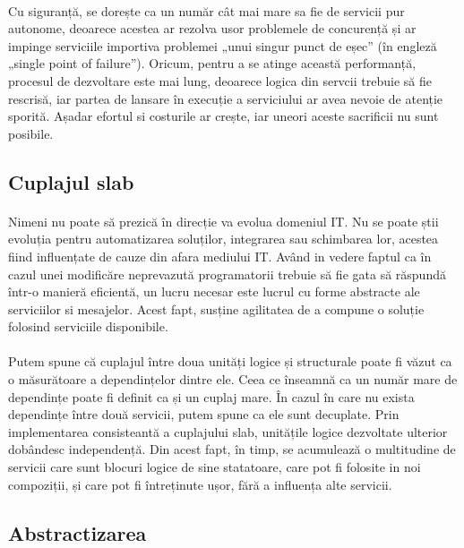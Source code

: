 \documentclass[12pt]{report}
\begin{document}
    \paragraph{}Cu siguranță, se dorește ca un număr cât mai mare sa fie de servicii pur autonome, deoarece acestea ar rezolva usor problemele de concurență și ar impinge serviciile importiva problemei „unui singur punct de eșec” (în engleză „single point of failure”). Oricum, pentru a se atinge această performanță, procesul de dezvoltare este mai lung, deoarece logica din servcii trebuie să fie rescrisă, iar partea de lansare în execuție a serviciului ar avea nevoie de atenție sporită. Așadar efortul si costurile ar crește, iar uneori aceste sacrificii nu sunt posibile.
  	\subsection{Cuplajul slab}
  	\paragraph{}Nimeni nu poate să prezică în direcție va evolua domeniul IT. Nu se poate știi evoluția pentru automatizarea soluților, integrarea sau schimbarea lor, acestea fiind influențate de cauze din afara mediului IT. Având in vedere faptul ca în cazul unei modificăre neprevazută programatorii trebuie să fie gata să răspundă într-o manieră eficientă, un lucru necesar este lucrul cu forme abstracte ale serviciilor si mesajelor. Acest fapt, susține agilitatea de a compune o soluție folosind serviciile disponibile. \cite{erl2}
  	\paragraph{}Putem spune că cuplajul între doua unități logice și structurale poate fi văzut ca o măsurătoare a dependințelor dintre ele. Ceea ce înseamnă ca un număr mare de dependințe poate fi definit ca și un cuplaj mare. În cazul în care nu exista dependințe între două servicii, putem spune ca ele sunt decuplate. Prin implementarea consisteantă a cuplajului slab, unitățile logice dezvoltate ulterior dobândesc independență. Din acest fapt, în timp, se acumulează o multitudine de servicii care sunt blocuri logice de sine statatoare, care pot fi folosite in noi compoziții, și care pot fi întreținute ușor, fără a influența alte servicii.
  	\subsection{Abstractizarea}
\end{document}
